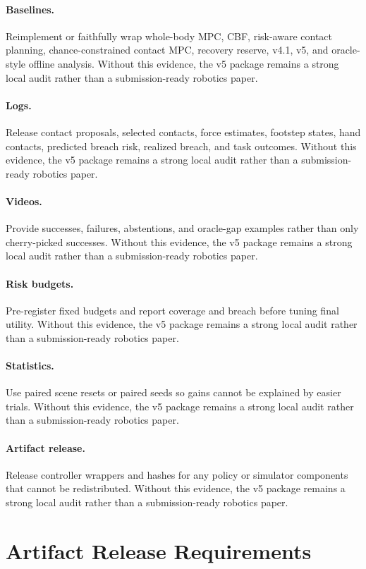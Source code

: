 \documentclass{article}
\begin{document}
\paragraph{Baselines.} Reimplement or faithfully wrap whole-body MPC, CBF, risk-aware contact planning, chance-constrained contact MPC, recovery reserve, v4.1, v5, and oracle-style offline analysis. Without this evidence, the v5 package remains a strong local audit rather than a submission-ready robotics paper.
\paragraph{Logs.} Release contact proposals, selected contacts, force estimates, footstep states, hand contacts, predicted breach risk, realized breach, and task outcomes. Without this evidence, the v5 package remains a strong local audit rather than a submission-ready robotics paper.
\paragraph{Videos.} Provide successes, failures, abstentions, and oracle-gap examples rather than only cherry-picked successes. Without this evidence, the v5 package remains a strong local audit rather than a submission-ready robotics paper.
\paragraph{Risk budgets.} Pre-register fixed budgets and report coverage and breach before tuning final utility. Without this evidence, the v5 package remains a strong local audit rather than a submission-ready robotics paper.
\paragraph{Statistics.} Use paired scene resets or paired seeds so gains cannot be explained by easier trials. Without this evidence, the v5 package remains a strong local audit rather than a submission-ready robotics paper.
\paragraph{Artifact release.} Release controller wrappers and hashes for any policy or simulator components that cannot be redistributed. Without this evidence, the v5 package remains a strong local audit rather than a submission-ready robotics paper.
\clearpage
\section{Artifact Release Requirements}
\end{document}
